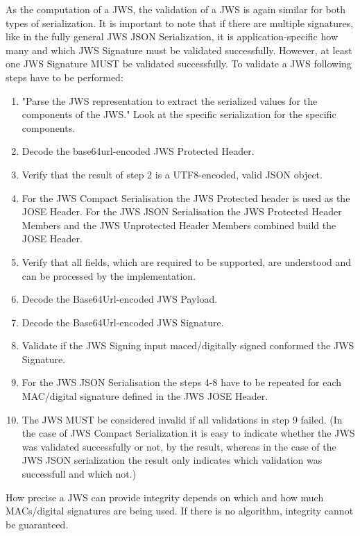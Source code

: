 As the computation of a JWS, the validation of a JWS is again similar for both types of serialization. It is important to note that if there are multiple signatures, like in the fully general JWS JSON Serialization,  it is application-specific how many and which JWS Signature must be validated successfully.\cite{rfc7515} However, at least one JWS Signature MUST be validated successfully.
To validate a JWS following steps have to be performed:\newline  
\begin{enumerate}
\item "Parse the JWS representation to extract the serialized values for the components of the JWS."\cite{rfc7515} Look at the specific serialization for the specific components.
\item Decode the base64url-encoded JWS Protected Header.
\item Verify that the result of step 2 is a UTF8-encoded, valid JSON object.
\item For the JWS Compact Serialisation the JWS Protected header is used as the JOSE Header. For the JWS JSON Serialisation the JWS Protected Header Members and the JWS Unprotected Header Members combined build the JOSE Header.
\item Verify that all fields, which are required to be supported, are understood and can be processed by the implementation.

\item Decode the Base64Url-encoded JWS Payload.
\item Decode the Base64Url-encoded JWS Signature.
\item Validate if the JWS Signing input maced/digitally signed conformed the JWS Signature.
\item For the JWS JSON Serialisation the steps 4-8 have to be repeated for each MAC/digital signature defined in the JWS JOSE Header.
\item The JWS MUST be considered invalid if all validations in step 9 failed. (In the case of JWS Compact Serialization it is easy to indicate whether the JWS was validated successfully or not, by the result, whereas in the case of the JWS JSON serialization the result only indicates which validation was successfull and which not.)
\end{enumerate}
How precise a JWS can provide integrity depends on which and how much MACs/digital signatures are being used. If there is no algorithm, integrity cannot be guaranteed. 
